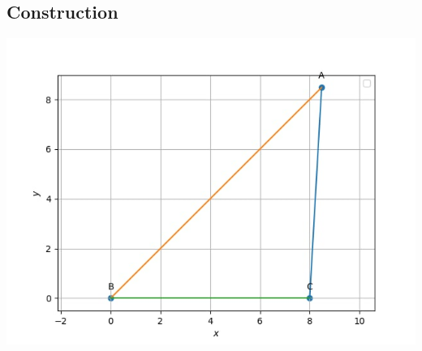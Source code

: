\documentclass[10pt,a4paper]{report}
\begin{document}
\begin{multicols}{2}
 \section{Construction}
   \begin{center}
  \includegraphics[scale=0.5]{Fig.png}
    \end{center}
\vspace{3cm}
\end{multicols}
\end{document}
